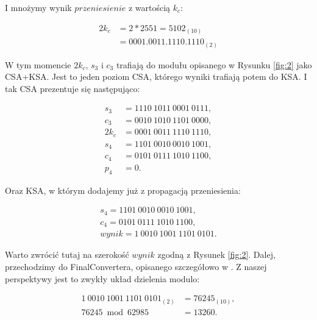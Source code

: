 \documentclass[comsoc]{IEEEtran}
\begin{document}
	I mnożymy wynik $przeniesienie$ z wartością $k_{c}$:
	
	\begin{equation} \label{eq:csa4}
	\begin{aligned}
	2k_{c} {}& = 2 * 2551 = 5102_{(10)}\\& = 0001.0011.1110.1110_{(2)}
	\end{aligned}
	\end{equation}
	
	W tym momencie $2k_{c}$, $s_{3}$ i $c_{3}$ trafiają do modułu opisanego w Rysunku \ref{fig:2} jako CSA+KSA. Jest to jeden poziom CSA, którego wyniki trafiają potem do KSA. I tak CSA prezentuje się następująco:
	
	\begin{equation} \label{eq:csa4}
	\begin{aligned}
	s_{3}& = 1110~1011~0001~0111,\\
	c_{3}& = 0010~1010~1101~0000,\\
	2k_{c}& = 0001~0011~1110~1110,\\
	s_{4}& = 1101~0010~0010~1001,\\
	c_{4}& = 0101~0111~1010~1100,\\
	p_{4}& = 0.
	\end{aligned}
	\end{equation}
	
	Oraz KSA, w którym dodajemy już z propagacją przeniesienia:
	
	\begin{equation} \label{eq:csa4}
	\begin{aligned}
	s_{4} = 1101~0010~0010~1001,\\
	c_{4} = 0101~0111~1010~1100,\\
	wynik = 1~0010~1001~1101~0101. 
	\end{aligned}
	\end{equation}
	
	Warto zwrócić tutaj na szerokość $wynik$ zgodną z Rysunek \ref{fig:2}. Dalej, przechodzimy do FinalConvertera, opisanego szczegółowo w \cite{17}. Z naszej perspektywy jest to zwykły układ dzielenia modulo:
	
	\begin{equation} \label{eq:csa4}
	\begin{aligned}
	1~0010~1001~1101~0101_{(2)}& = 76245_{(10)}, \\
	76245 \bmod 62985& = 13260.
	\end{aligned}
	\end{equation}
	
\end{document}
